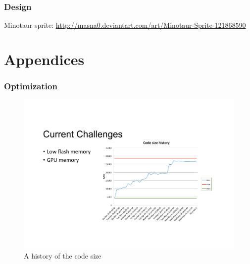 \documentclass[12pt]{report}
\begin{document}
\subsection*{Design}
Minotaur sprite: \url{http://masna0.deviantart.com/art/Minotaur-Sprite-121868590}

\newpage
\chapter{Appendices}


\subsection*{Optimization}
\begin{figure}[h]
  \centering
  \includegraphics[scale=1]{Figures/CodeSizeChart}
  \caption{A history of the code size}
  \label{fig:code_size}
\end{figure}
\newpage
\end{document}
